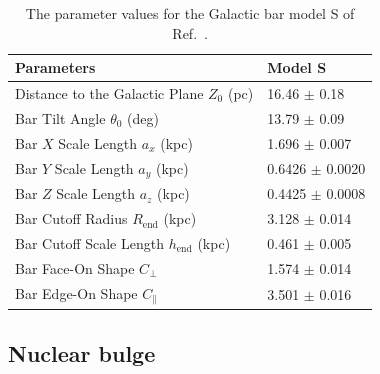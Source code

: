 \documentclass[doublespace,nopageskip]{VTthesis} %
\begin{document}

\begin{table}[htb]
\centering
\caption{ The parameter values for the Galactic bar model S of Ref.~\cite{1998ApJ...492..495F}.}
    \begin{tabular}{ll}
    \toprule
      Parameters & Model S \\ 
      \midrule
      Distance to the Galactic Plane $Z_0$ (pc) & 16.46 $\pm$ 0.18\\
      Bar Tilt Angle $\theta_0$ (deg) & 13.79 $\pm$ 0.09\\
      Bar $X$ Scale Length $a_x$ (kpc) & 1.696 $\pm$ 0.007 \\
      Bar $Y$ Scale Length $a_y$ (kpc) & 0.6426 $\pm$ 0.0020 \\
      Bar $Z$ Scale Length $a_z$ (kpc) & 0.4425 $\pm$ 0.0008 \\
      Bar Cutoff Radius $R_{\text{end}}$ (kpc) & 3.128 $\pm$ 0.014 \\
      Bar Cutoff Scale Length $h_{\text{end}}$ (kpc) & 0.461 $\pm$ 0.005 \\
      Bar Face-On Shape $C_\perp$ & 1.574 $\pm$ 0.014 \\
      Bar Edge-On Shape $C_\parallel$ & 3.501 $\pm$ 0.016\\
      \bottomrule
    \end{tabular}
\label{tab:modelS}
\end{table}

\subsection{Nuclear bulge}\label{sec:nb}
\end{document}
